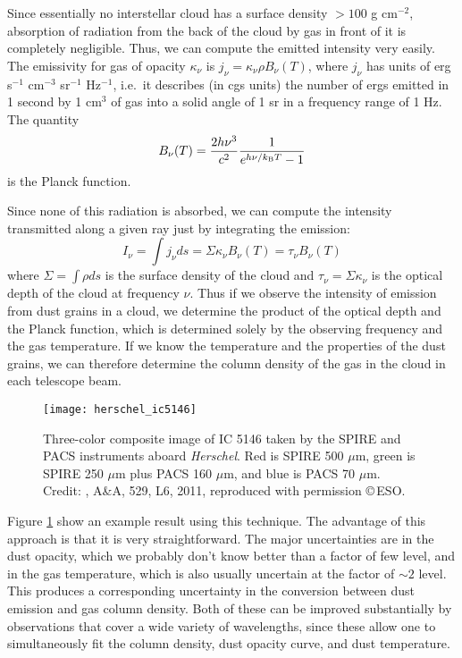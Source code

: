 Since essentially no interstellar cloud has a surface density $> 100$ g cm$^{-2}$, absorption of radiation from the back of the cloud by gas in front of it is completely negligible. Thus, we can compute the emitted intensity very easily. The emissivity for gas of opacity $\kappa_{\nu}$ is $j_{\nu} = \kappa_{\nu} \rho B_{\nu}(T)$, where $j_{\nu}$ has units of erg s$^{-1}$ cm$^{-3}$ sr$^{-1}$ Hz$^{-1}$, i.e.\ it describes (in cgs units) the number of ergs emitted in 1 second by 1 cm$^3$ of gas into a solid angle of 1 sr in a frequency range of 1 Hz. The quantity
\begin{equation}
B_{\nu}(T) = \frac{2 h\nu^3}{c^2} \frac{1}{e^{h\nu/k_{\mathrm{B}} T}-1}
\end{equation}
is the Planck function.
  
Since none of this radiation is absorbed, we can compute the intensity transmitted along a given ray just by integrating the emission: 
  \begin{equation}
  I_{\nu} = \int j_{\nu} ds = \Sigma \kappa_{\nu} B_{\nu}(T) = \tau_{\nu} B_{\nu}(T)
  \end{equation}
where $\Sigma=\int \rho ds$ is the surface density of the cloud and $\tau_{\nu} = \Sigma \kappa_{\nu}$ is the optical depth of the cloud at frequency $\nu$. Thus if we observe the intensity of emission from dust grains in a cloud, we determine the product of the optical depth and the Planck function, which is determined solely by the observing frequency and the gas temperature. If we know the temperature and the properties of the dust grains, we can therefore determine the column density of the gas in the cloud in each telescope beam.

\begin{figure}
\texttt{[image: herschel\_ic5146]}
\caption[\textit{Herschel} map of IC 5146]{
\label{fig:herschel_ic5146}
Three-color composite image of IC 5146 taken by the SPIRE and PACS instruments aboard \textit{Herschel}. Red is SPIRE 500 $\mu$m, green is SPIRE 250 $\mu$m plus PACS 160 $\mu$m, and blue is PACS 70 $\mu$m. Credit: \citeauthor{arzoumanian11a}, A\&A, 529, L6, 2011, reproduced with permission \copyright\,ESO.
}
\end{figure}

Figure \ref{fig:herschel_ic5146} show an example result using this technique. The advantage of this approach is that it is very straightforward. The major uncertainties are in the dust opacity, which we probably don't know better than a factor of few level, and in the gas temperature, which is also usually uncertain at the factor of $\sim 2$ level. This produces a corresponding uncertainty in the conversion between dust emission and gas column density. Both of these can be improved substantially by observations that cover a wide variety of wavelengths, since these allow one to simultaneously fit the column density, dust opacity curve, and dust temperature.

